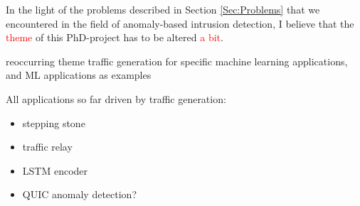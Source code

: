\documentclass[a4paper,12pt,twoside]{article}
\begin{document}
In the light of the problems described in Section \ref{Sec:Problems} that we encountered in the field of anomaly-based intrusion detection, I believe that the \textcolor{red}{theme} of this PhD-project has to be altered \textcolor{red}{a bit}. 

reoccurring theme traffic generation for specific machine learning applications, and ML applications as examples

All applications so far driven by traffic generation:
\begin{itemize}
\item stepping stone
\item traffic relay
\item LSTM encoder
\item QUIC anomaly detection?
\end{itemize}





\end{document}
